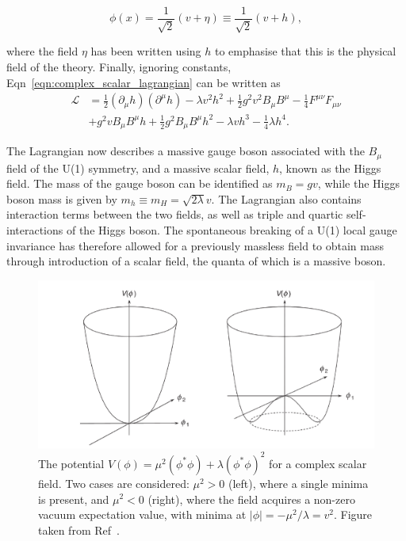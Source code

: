 \begin{equation}
    \phi(x) = \frac{1}{\sqrt{2}}(v+\eta) \equiv \frac{1}{\sqrt{2}}(v+h),
\end{equation}

\noindent where the field $\eta$ has been written using $h$ to emphasise that this is the physical field of the theory. Finally, ignoring constants, Eqn~\ref{eqn:complex_scalar_lagrangian} can be written as~\cite{Thomson}
\begin{equation}
\label{eqn:complex_scalar_lagrangian_full}
\begin{split}
    \mathcal{L} &= \frac{1}{2}(\partial_{\mu}h)(\partial^{\mu}h) - \lambda v^{2}h^{2} +         \frac{1}{2}g^{2}v^{2}B_{\mu}B^{\mu} - \frac{1}{4}F^{\mu\nu}F_{\mu\nu} \\
     &+ g^{2}vB_{\mu}B^{\mu}h + \frac{1}{2}g^{2}B_{\mu}B^{\mu}h^{2} - 
    \lambda vh^{3} - \frac{1}{4}\lambda h^{4}.
\end{split}
\end{equation}

\noindent The Lagrangian now describes a massive gauge boson associated with the $B_{\mu}$ field of the U(1) symmetry, and a massive scalar field, $h$, known as the Higgs field. The mass of the gauge boson can be identified as $m_{B} = gv$, while the Higgs boson mass is given by $m_{h}\equiv m_{H}=\sqrt{2\lambda}v$. The Lagrangian also contains interaction terms between the two fields, as well as triple and quartic self-interactions of the Higgs boson. The spontaneous breaking  of a U(1) local gauge invariance has therefore allowed for a previously massless field to obtain mass through introduction of a scalar field, the quanta of which is a massive boson.

\begin{figure}[htbp!]
\centering
\includegraphics[width =0.7\linewidth]{Figures/Theory/higgs_potential.pdf}%
\caption[The potential for a complex scalar field.]{The potential $V(\phi) = \mu^{2}(\phi^{*}\phi) + \lambda(\phi^{*}\phi)^{2}$ for a complex scalar field. Two cases are considered: $\mu^{2}>0$ (left), where a single minima is present, and $\mu^{2}<0$ (right), where the field acquires a non-zero vacuum expectation value, with minima at $|\phi| = -\mu^{2}/\lambda = v^{2}$. Figure taken from Ref~\cite{Thomson}.}
\label{fig:higgs_potential}                                              
\end{figure}

